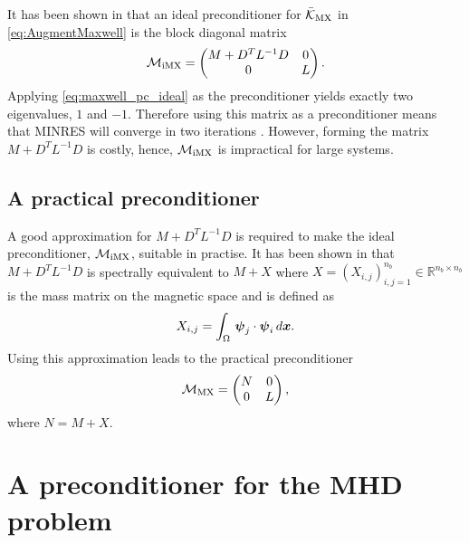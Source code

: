 It has been shown in \cite{greif2007preconditioners} that an ideal preconditioner for $\bar{\mathcal{K}}_{\rm MX}$ in \eqref{eq:AugmentMaxwell} is the block diagonal matrix
\begin{equation}
\label{eq:maxwell_pc_ideal}
\mathcal{M}_{\rm iMX} =
\begin{pmatrix}
M+D^T L^{-1} D & 0 \\
0 & L
\end{pmatrix}.
\end{equation}
Applying \eqref{eq:maxwell_pc_ideal} as the preconditioner yields exactly two eigenvalues, $1$ and $-1$. Therefore using this matrix as a preconditioner means that MINRES will converge in two iterations  \cite{paige1975solution}. However, forming the matrix $M+D^T L^{-1} D$ is costly, hence, $\mathcal{M}_{\rm iMX}$  is  impractical  for large systems.


\subsection{A practical preconditioner}

A good approximation for $M+D^T L^{-1} D$ is required to make the ideal preconditioner, $\mathcal{M}_{\rm iMX}$, suitable in practise. It has been shown in \cite{greif2007preconditioners}  that $M+D^T L^{-1} D$ is spectrally equivalent to $M+X$  where $X=(X_{i,j})_{i,j=1}^{n_b}\in{\mathbb R}^{n_b \times n_b}$ is the mass matrix on the magnetic space and is defined as
\begin{equation}
\label{eq:magnetic_mass}
X_{i,j}=\int_\Omega\, \boldsymbol \psi_j\cdot\boldsymbol \psi_i\,d\boldsymbol x.
\end{equation}
Using this approximation leads to the practical preconditioner
\begin{equation}
\label{eq:maxwell_pc_X}
\mathcal{M}_{\rm MX} =
\begin{pmatrix}
N& 0 \\
0 & L
\end{pmatrix},
\end{equation}
where $N = M+X$.

\section{A preconditioner for the MHD problem}
\label{sec:MHDprecond}

